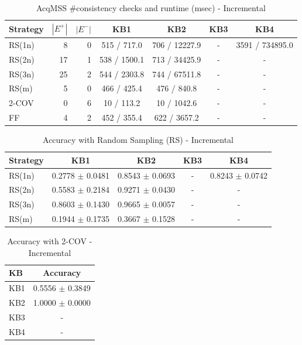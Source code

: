 \usepackage{booktabs}


\begin{table}[htbp]
\centering
\caption{AcqMSS \#consistency checks and runtime (msec) - Incremental}
\label{tab:table7_incremental}
\begin{tabular}{lrrcccc}
\toprule
Strategy & $|E^+|$ & $|E^-|$ & KB1 & KB2 & KB3 & KB4 \\
\midrule
RS(1n) & 8 & 0 & 515 / 717.0 & 706 / 12227.9 & - & 3591 / 734895.0 \\
RS(2n) & 17 & 1 & 538 / 1500.1 & 713 / 34425.9 & - & - \\
RS(3n) & 25 & 2 & 544 / 2303.8 & 744 / 67511.8 & - & - \\
RS(m) & 5 & 0 & 466 / 425.4 & 476 / 840.8 & - & - \\
2-COV & 0 & 6 & 10 / 113.2 & 10 / 1042.6 & - & - \\
FF & 4 & 2 & 452 / 355.4 & 622 / 3657.2 & - & - \\
\bottomrule
\end{tabular}
\end{table}

\begin{table}[htbp]
\centering
\caption{Accuracy with Random Sampling (RS) - Incremental}
\label{tab:table9_incremental}
\begin{tabular}{lcccc}
\toprule
Strategy & KB1 & KB2 & KB3 & KB4 \\
\midrule
RS(1n) & 0.2778 $\pm$ 0.0481 & 0.8543 $\pm$ 0.0693 & - & 0.8243 $\pm$ 0.0742 \\
RS(2n) & 0.5583 $\pm$ 0.2184 & 0.9271 $\pm$ 0.0430 & - & - \\
RS(3n) & 0.8603 $\pm$ 0.1430 & 0.9665 $\pm$ 0.0057 & - & - \\
RS(m) & 0.1944 $\pm$ 0.1735 & 0.3667 $\pm$ 0.1528 & - & - \\
\bottomrule
\end{tabular}
\end{table}

\begin{table}[htbp]
\centering
\caption{Accuracy with 2-COV - Incremental}
\label{tab:table10_incremental}
\begin{tabular}{lc}
\toprule
KB & Accuracy \\
\midrule
KB1 & 0.5556 $\pm$ 0.3849 \\
KB2 & 1.0000 $\pm$ 0.0000 \\
KB3 & - \\
KB4 & - \\
\bottomrule
\end{tabular}
\end{table}

